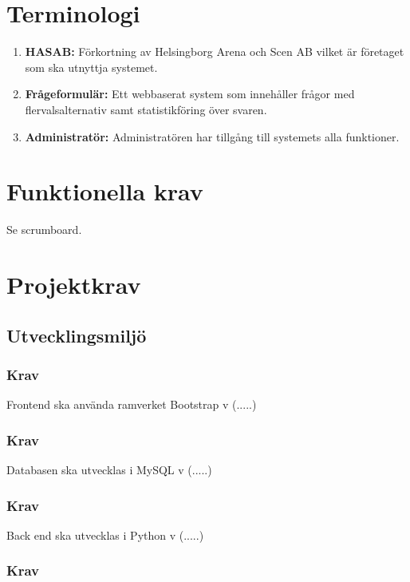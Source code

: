 \documentclass{article}
\begin{document}
    \section{Terminologi}
    \begin{enumerate}
        \item \textbf{HASAB:} Förkortning av Helsingborg Arena och Scen AB vilket är företaget som ska utnyttja systemet.
        \item \textbf{Frågeformulär:} Ett webbaserat system som innehåller frågor med flervalsalternativ samt statistikföring över svaren.
        \item \textbf{Administratör:} Administratören har tillgång till systemets alla funktioner.
    \end{enumerate}
    
    \section{Funktionella krav}
    Se scrumboard.
    
    \section{Projektkrav}
    \subsection{Utvecklingsmiljö}
    \subsubsection{Krav}
    Frontend ska använda ramverket Bootstrap v (.....)
    \subsubsection{Krav}
    Databasen ska utvecklas i MySQL v (.....)
    \subsubsection{Krav}
    Back end ska utvecklas i Python v (.....)
    
    \subsubsection{Krav}

    
        





\end{document}
